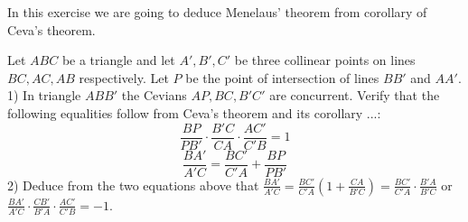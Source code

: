 \begin{exercise}
In this exercise we are going to deduce Menelaus' theorem from corollary of Ceva's theorem.

Let $ABC$ be a triangle and let $A',B',C'$ be three collinear points on lines $BC,AC,AB$ respectively. Let $P$ be the point of intersection of lines $BB'$ and $AA'$.
1) In triangle $ABB'$ the Cevians $AP,BC,B'C'$ are concurrent. Verify that the following equalities follow from Ceva's theorem and its corollary ...: $$\frac{BP}{PB'}\cdot\frac{B'C}{CA}\cdot\frac{AC'}{C'B}=1$$
$$\frac{BA'}{A'C}=\frac{BC'}{C'A}+\frac{BP}{PB'}$$
2) Deduce from the two equations above that $\frac{BA'}{A'C}=\frac{BC'}{C'A}(1+\frac{CA}{B'C})=\frac{BC'}{C'A}\cdot\frac{B'A}{B'C}$ or $\frac{BA'}{A'C}\cdot\frac{CB'}{B'A}\cdot\frac{AC'}{C'B}=-1$.
\end{exercise}